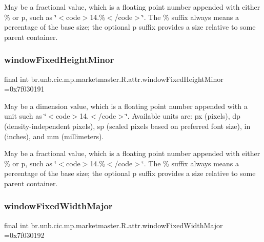 May be a fractional value, which is a floating point number appended with either \% or p, such as \char`\"{}$<$code$>$14.\%$<$/code$>$\char`\"{}. The \% suffix always means a percentage of the base size; the optional p suffix provides a size relative to some parent container. \mbox{\label{classbr_1_1unb_1_1cic_1_1mp_1_1marketmaster_1_1R_1_1attr_a60a01dd87528d59659874bcf6b6794f8}} 
\subsubsection{\texorpdfstring{window\+Fixed\+Height\+Minor}{windowFixedHeightMinor}}
{\footnotesize\ttfamily final int br.\+unb.\+cic.\+mp.\+marketmaster.\+R.\+attr.\+window\+Fixed\+Height\+Minor =0x7f030191\hspace{0.3cm}{\ttfamily [static]}}

May be a dimension value, which is a floating point number appended with a unit such as \char`\"{}$<$code$>$14.\+5sp$<$/code$>$\char`\"{}. Available units are\+: px (pixels), dp (density-\/independent pixels), sp (scaled pixels based on preferred font size), in (inches), and mm (millimeters). 

May be a fractional value, which is a floating point number appended with either \% or p, such as \char`\"{}$<$code$>$14.\%$<$/code$>$\char`\"{}. The \% suffix always means a percentage of the base size; the optional p suffix provides a size relative to some parent container. \mbox{\label{classbr_1_1unb_1_1cic_1_1mp_1_1marketmaster_1_1R_1_1attr_ab2d5ddfa01349632ef3e8c96ac6b135b}} 
\subsubsection{\texorpdfstring{window\+Fixed\+Width\+Major}{windowFixedWidthMajor}}
{\footnotesize\ttfamily final int br.\+unb.\+cic.\+mp.\+marketmaster.\+R.\+attr.\+window\+Fixed\+Width\+Major =0x7f030192\hspace{0.3cm}{\ttfamily [static]}}

